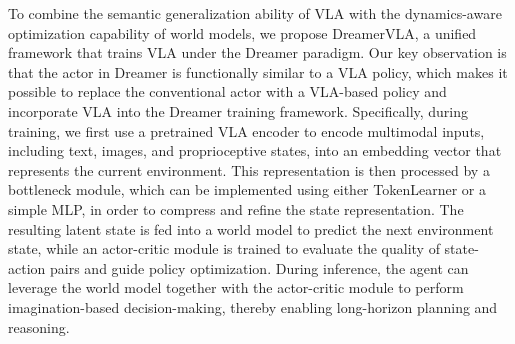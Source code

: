 To combine the semantic generalization ability of VLA with the dynamics-aware optimization capability of world models, we propose DreamerVLA, a unified framework that trains VLA under the Dreamer paradigm. Our key observation is that the actor in Dreamer is functionally similar to a VLA policy, which makes it possible to replace the conventional actor with a VLA-based policy and incorporate VLA into the Dreamer training framework. Specifically, during training, we first use a pretrained VLA encoder to encode multimodal inputs, including text, images, and proprioceptive states, into an embedding vector that represents the current environment. This representation is then processed by a bottleneck module, which can be implemented using either TokenLearner or a simple MLP, in order to compress and refine the state representation. The resulting latent state is fed into a world model to predict the next environment state, while an actor-critic module is trained to evaluate the quality of state-action pairs and guide policy optimization. During inference, the agent can leverage the world model together with the actor-critic module to perform imagination-based decision-making, thereby enabling long-horizon planning and reasoning.
